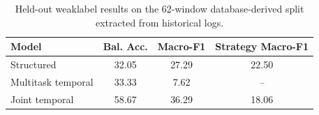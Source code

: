 \begin{table}[t]
\centering
\caption{Held-out weaklabel results on the 62-window database-derived split extracted from historical logs.}
\label{tab:weaklabel-results}
\small
\begin{tabular}{lccc}
\toprule
Model & Bal. Acc. & Macro-F1 & Strategy Macro-F1 \\
\midrule
Structured & 32.05 & 27.29 & 22.50 \\
Multitask temporal & 33.33 & 7.62 & -- \\
Joint temporal & 58.67 & 36.29 & 18.06 \\
\bottomrule
\end{tabular}
\end{table}
